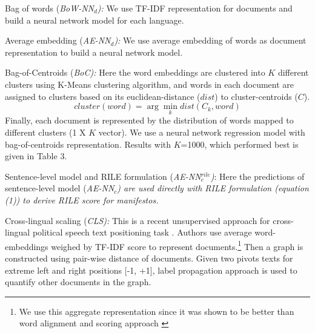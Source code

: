 \documentclass[11pt,a4paper]{article}
\newcommand{\argmin}{\arg\!\min}
\begin{document}
\begin{description}
\item{Bag of words (\em{BoW-NN$_{d}$}):} \rm We use TF-IDF representation for documents and build a neural network model  for each language.
\item{Average embedding (\em{AE-NN}$_{d}$):} We use average embedding of words as document representation to build a neural network model.

\item{Bag-of-Centroids (\em{BoC}):} Here the word embeddings are clustered into $K$ different clusters using K-Means clustering algorithm, and  words in each document are assigned to clusters based on its euclidean-distance ($dist$) to cluster-centroids ($C$). 
\[ cluster (word) = \argmin_k dist(C_{k}, word) \]
Finally, each document is represented by the distribution of words mapped to different clusters (1 X $K$ vector). We use a neural network regression model with bag-of-centroids representation. Results with $K$=1000, which performed best is given in Table 3.

\item{Sentence-level model and RILE formulation (\em{AE-NN}$_{c}^{rile}$)}: Here the predictions of sentence-level model (\em{AE-NN$_{c}$}) \rm are used directly with RILE formulation (equation (1)) to derive RILE score for manifestos.

\item{Cross-lingual scaling (\em{CLS}):} This is a recent unsupervised approach for cross-lingual political speech text positioning task \cite{EACL}. Authors use average word-embeddings weighed by TF-IDF score to represent documents.\footnote{We use this aggregate representation since it was shown to be better than word alignment and scoring approach \cite{EACL}} Then a graph is constructed using pair-wise distance of documents. Given two pivots texts for extreme left and right positions [-1, +1], label propagation approach is used to quantify other documents in the graph.
\end{description}
\end{document}
